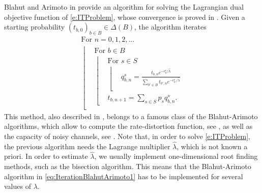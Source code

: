 \documentclass[smallextended,referee,envcountsect,]{svjour3}
\begin{document}
{Blahut and Arimoto in 
\cite{Arimoto72,Blahut72} provide an algorithm for solving the 
Lagrangian dual objective function of \eqref{e:ITProblem}, whose 
convergence is proved in \cite[Theorem~1]{Csiszar74}. Given a 
starting probability 
$(t_{b,0})_{b\in B}\in\Delta(B)$, the algorithm iterates 
\begin{align}
&\text{For }n=0,1,2,...\nonumber\\
&\left\lfloor 
\begin{array}{lll}
&\text{For }b\in B \\
&\left\lfloor 
\begin{array}{ll}
&\text{For }s\in S \\
&\left\lfloor 
\begin{array}{ll}
&q_{b,n}^s = \frac{t_{b,n} e^{-c_{b}^s/\widehat{\lambda} 
}}{\sum_{b'\in B}t_{b'\!,n} 
e^{- c_{b'}^s/\widehat{\lambda} } }\\[3pt]
\end{array}
\right.\\[5pt]
&t_{b,n+1} = \sum_{s\in S} p_s q_{b,n}^s.
\end{array}
\right.\\ 
\end{array}
\right. 
\label{eq:IterationBlahutArimoto1}
\end{align}
This method, also described in \cite[Theorem~8.6]{CsiszarKorner(Book)11}, belongs to a famous class of the Blahut-Arimoto algorithms, which allow to compute the rate-distortion function, see \cite[equation (10.11)]{cover-book-2006}, as well as the capacity of noisy channels, see \cite[equation (7.1)]{cover-book-2006}. %
Note that, in order to solve \eqref{e:ITProblem}, {the previous} 
algorithm needs the Lagrange multiplier $\widehat{\lambda}$, which is 
not known a priori. In order to estimate $\widehat{\lambda}$, we 
usually implement  one-dimensional root finding methods, such as 
the bisection algorithm. This means that the 
Blahut-Arimoto algorithm in \eqref{eq:IterationBlahutArimoto1} has 
to be implemented for several values of $\lambda$.}
\end{document}
